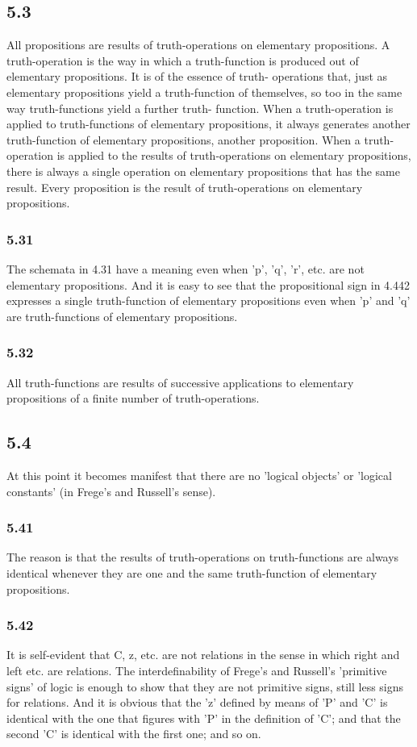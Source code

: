 \documentclass[11pt]{article}
\begin{document}
\subsection*{5.3}
\label{sec:orgf6019d9}
All propositions are results of truth-operations on elementary
propositions. A truth-operation is the way in which a truth-function is
produced out of elementary propositions. It is of the essence of truth-
operations that, just as elementary propositions yield a truth-function of
themselves, so too in the same way truth-functions yield a further truth-
function. When a truth-operation is applied to truth-functions of
elementary propositions, it always generates another truth-function of
elementary propositions, another proposition. When a truth-operation is
applied to the results of truth-operations on elementary propositions,
there is always a single operation on elementary propositions that has the
same result. Every proposition is the result of truth-operations on
elementary propositions.
\subsubsection*{5.31}
\label{sec:orgb51a2ec}
The schemata in 4.31 have a meaning even when 'p', 'q', 'r', etc. are
not elementary propositions. And it is easy to see that the propositional
sign in 4.442 expresses a single truth-function of elementary propositions
even when 'p' and 'q' are truth-functions of elementary propositions.
\subsubsection*{5.32}
\label{sec:orgaa56c47}
All truth-functions are results of successive applications to
elementary propositions of a finite number of truth-operations.
\subsection*{5.4}
\label{sec:org83eed2e}
At this point it becomes manifest that there are no 'logical objects'
or 'logical constants' (in Frege's and Russell's sense).
\subsubsection*{5.41}
\label{sec:org5abd192}
The reason is that the results of truth-operations on truth-functions
are always identical whenever they are one and the same truth-function of
elementary propositions.
\subsubsection*{5.42}
\label{sec:orgea0404e}
It is self-evident that C, z, etc. are not relations in the sense in
which right and left etc. are relations. The interdefinability of Frege's
and Russell's 'primitive signs' of logic is enough to show that they are
not primitive signs, still less signs for relations. And it is obvious that
the 'z' defined by means of 'P' and 'C' is identical with the one that
figures with 'P' in the definition of 'C'; and that the second 'C' is
identical with the first one; and so on.
\end{document}
